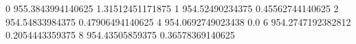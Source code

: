 0 955.3843994140625 1.31512451171875
1 954.52490234375 0.45562744140625
2 954.54833984375 0.47906494140625
4 954.0692749023438 0.0
6 954.2747192382812 0.2054443359375
8 954.43505859375 0.36578369140625
